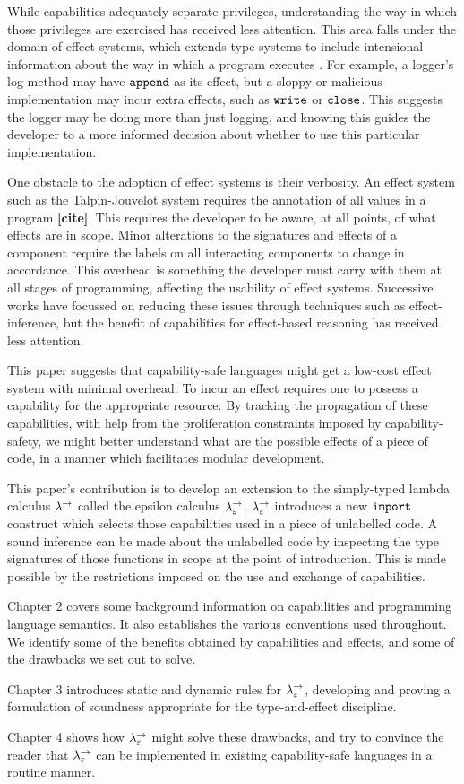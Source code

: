 While capabilities adequately separate privileges, understanding the way in which those privileges are exercised has received less attention. This area falls under the domain of effect systems, which extends type systems to include intensional information about the way in which a program executes \cite{nielson99}. For example, a logger's log method may have $\mathtt{append}$ as its effect, but a sloppy or malicious implementation may incur extra effects, such as $\mathtt{write}$ or $\mathtt{close}$. This suggests the logger may be doing more than just logging, and knowing this guides the developer to a more informed decision about whether to use this particular implementation.

One obstacle to the adoption of effect systems is their verbosity. An effect system such as the Talpin-Jouvelot system requires the annotation of all values in a program \textbf{[cite]}. This requires the developer to be aware, at all points, of what effects are in scope. Minor alterations to the signatures and effects of a component require the labels on all interacting components to change in accordance. This overhead is something the developer must carry with them at all stages of programming, affecting the usability of effect systems. Successive works have focussed on reducing these issues through techniques such as effect-inference, but the benefit of capabilities for effect-based reasoning has received less attention.

This paper suggests that capability-safe languages might get a low-cost effect system with minimal overhead. To incur an effect requires one to possess a capability for the appropriate resource. By tracking the propagation of these capabilities, with help from the proliferation constraints imposed by capability-safety, we might better understand what are the possible effects of a piece of code, in a manner which facilitates modular development.

This paper's contribution is to develop an extension to the simply-typed lambda calculus $\lambda^{\rightarrow}$ called the epsilon calculus $\lambda^{\rightarrow}_{\varepsilon}$. $\lambda^{\rightarrow}_{\varepsilon}$ introduces a new $\mathtt{import}$ construct which selects those capabilities used in a piece of unlabelled code. A sound inference can be made about the unlabelled code by inspecting the type signatures of those functions in scope at the point of introduction. This is made possible by the restrictions imposed on the use and exchange of capabilities.

Chapter 2 covers some background information on capabilities and programming language semantics. It also establishes the various conventions used throughout. We identify some of the benefits obtained by capabilities and effects, and some of the drawbacks we set out to solve.

Chapter 3 introduces static and dynamic rules for $\lambda^{\rightarrow}_{\varepsilon}$, developing and proving a formulation of soundness appropriate for the type-and-effect discipline. 

Chapter 4 shows how $\lambda^{\rightarrow}_{\varepsilon}$ might solve these drawbacks, and try to convince the reader that $\lambda^{\rightarrow}_{\varepsilon}$ can be implemented in existing capability-safe languages in a routine manner.
 
